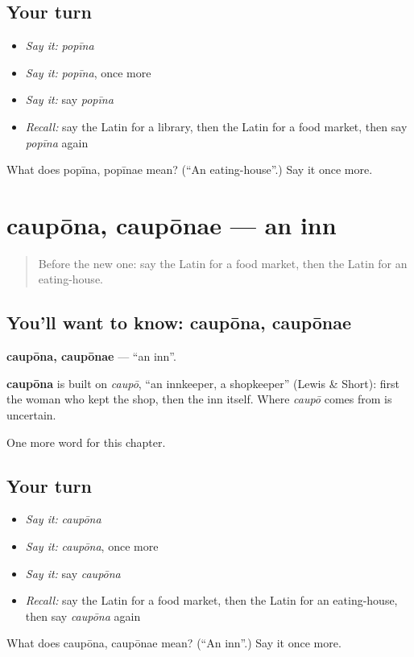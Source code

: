 \subsection*{Your turn}
\begin{itemize}
\raggedright
  \item \emph{Say it:} \emph{popīna}
  \item \emph{Say it:} \emph{popīna}, once more
  \item \emph{Say it:} say \emph{popīna}
  \item \emph{Recall:} say the Latin for a library, then the Latin for a food market, then say \emph{popīna} again
\end{itemize}

\begin{tcolorbox}[breakable,colback=teal!4,colframe=teal!35!black,title={Before you move on}]
What does popīna, popīnae mean? (\textquotedblleft{}An eating-house\textquotedblright{}.) Say it once more.
\end{tcolorbox}
\section[caupōna, caupōnae]{caupōna, caupōnae — an inn}

\label{lesson:LA-C117-caupona}



\begin{quote}
Before the new one: say the Latin for a food market, then the Latin for an eating-house.
\end{quote}

\subsection*{You'll want to know: caupōna, caupōnae}
\textbf{caupōna, caupōnae} — \textquotedblleft{}an inn\textquotedblright{}.

\begin{cousinweb}
\textbf{caupōna} is built on \emph{caupō}, \textquotedblleft{}an innkeeper, a shopkeeper\textquotedblright{} (Lewis \& Short): first the woman who kept the shop, then the inn itself. Where \emph{caupō} comes from is uncertain.
\end{cousinweb}

\begin{grammarlens}[title={What you've built}]
One more word for this chapter.
\end{grammarlens}

\subsection*{Your turn}
\begin{itemize}
\raggedright
  \item \emph{Say it:} \emph{caupōna}
  \item \emph{Say it:} \emph{caupōna}, once more
  \item \emph{Say it:} say \emph{caupōna}
  \item \emph{Recall:} say the Latin for a food market, then the Latin for an eating-house, then say \emph{caupōna} again
\end{itemize}

\begin{tcolorbox}[breakable,colback=teal!4,colframe=teal!35!black,title={Before you move on}]
What does caupōna, caupōnae mean? (\textquotedblleft{}An inn\textquotedblright{}.) Say it once more.
\end{tcolorbox}
